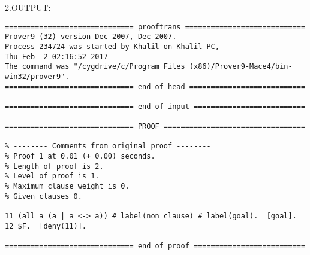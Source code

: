 \documentclass[fullpage]{article}
\begin{document}
2.OUTPUT:

 {\footnotesize \begin{verbatim}
============================== prooftrans ============================
Prover9 (32) version Dec-2007, Dec 2007.
Process 234724 was started by Khalil on Khalil-PC,
Thu Feb  2 02:16:52 2017
The command was "/cygdrive/c/Program Files (x86)/Prover9-Mace4/bin-win32/prover9".
============================== end of head ===========================

============================== end of input ==========================

============================== PROOF =================================

% -------- Comments from original proof --------
% Proof 1 at 0.01 (+ 0.00) seconds.
% Length of proof is 2.
% Level of proof is 1.
% Maximum clause weight is 0.
% Given clauses 0.

11 (all a (a | a <-> a)) # label(non_clause) # label(goal).  [goal].
12 $F.  [deny(11)].

============================== end of proof ==========================
\end{verbatim} }
\end{document}
